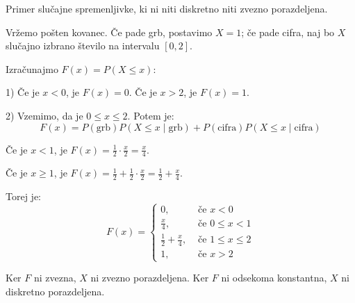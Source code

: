 \documentclass[12pt]{book}
\def\n{\noindent}
\theoremstyle{definition}
\theoremstyle{plain}
\theoremstyle{plain}
\theoremstyle{plain}
\theoremstyle{remark}
\begin{document}
\begin{zgled}
    Primer slučajne spremenljivke, ki ni niti diskretno niti zvezno porazdeljena. 

    \n Vržemo pošten kovanec. Če pade grb, postavimo $X=1$; če pade cifra, naj bo $X$ slučajno izbrano število na intervalu $[0,2]$. \vspace{2pt}
    
    \n Izračunajmo $F(x)=P(X \leq x)$:
    
    1) Če je $x<0$, je $F(x) = 0$. Če je $x>2$, je $F(x) = 1$.

    2) Vzemimo, da je $0 \leq x \leq 2$. Potem je:
    $$
    F(x) = P(\text{grb}) P(X\leq x \mid \text{grb}) + P(\text{cifra}) P(X\leq x \mid \text{cifra})
    $$

    \qquad Če je $x<1$, je $F(x)=\frac{1}{2} \cdot \frac{x}{2}=\frac{x}{4}$.

    \qquad Če je $x \geq 1$, je $F(x)=\frac{1}{2}+\frac{1}{2} \cdot \frac{x}{2}=\frac{1}{2}+\frac{x}{4}$.

    \n Torej je: 
    $$
    F(x)=
    \begin{cases}
        0, & \text{ če } x<0 \\
        \frac{x}{4}, & \text{ če } 0 \leq x<1 \\
        \frac{1}{2}+\frac{x}{4}, & \text{ če } 1 \leq x \leq 2 \\
        1, & \text{ če } x>2
    \end{cases}
    $$


    \n Ker $F$ ni zvezna, $X$ ni zvezno porazdeljena. Ker $F$ ni odsekoma konstantna, $X$ ni diskretno porazdeljena. 
\end{zgled}
\end{document}
